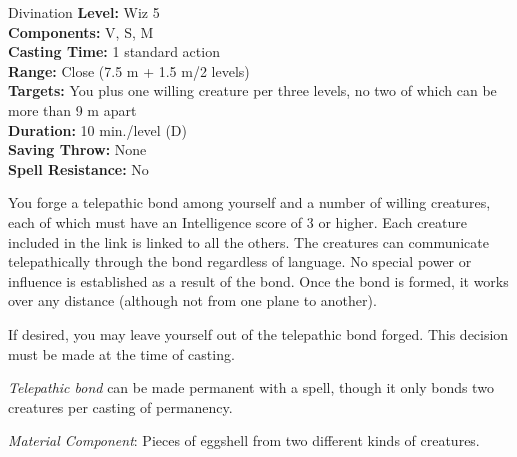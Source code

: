 {Divination}
{
	\textbf{Level:}
	Wiz 5\\
	\textbf{Components:}
	V, S, M\\
	\textbf{Casting Time:}
	1 standard action\\
	\textbf{Range:}
	Close (7.5 m + 1.5 m/2 levels)\\
	\textbf{Targets:}
	You plus one willing creature per three levels, no two of which can be more than 9 m apart\\
	\textbf{Duration:}
	10 min./level (D)\\
	\textbf{Saving Throw:}
	None\\
	\textbf{Spell Resistance:}
	No\\
}
{
	You forge a telepathic bond among yourself and a number of willing creatures, each of which must have an Intelligence score of 3 or higher. Each creature included in the link is linked to all the others. The creatures can communicate telepathically through the bond regardless of language. No special power or influence is established as a result of the bond. Once the bond is formed, it works over any distance (although not from one plane to another).

	If desired, you may leave yourself out of the telepathic bond forged. This decision must be made at the time of casting.

	\emph{Telepathic bond} can be made permanent with a  spell, though it only bonds two creatures per casting of permanency.

	\textit{Material Component}:
	Pieces of eggshell from two different kinds of creatures.

}
